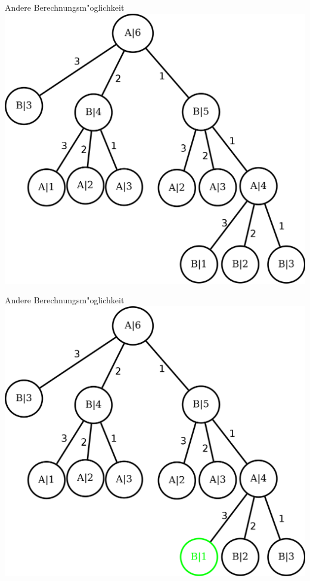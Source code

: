 \documentclass[18pt]{beamer}
\begin{document}
\begin{frame}{Andere Berechnungsm"oglichkeit}
\includegraphics[scale=0.4]{baum0.png}
\end{frame}

\begin{frame}{Andere Berechnungsm"oglichkeit}
\includegraphics[scale=0.4]{baum1.png}
\end{frame}
\end{document}
